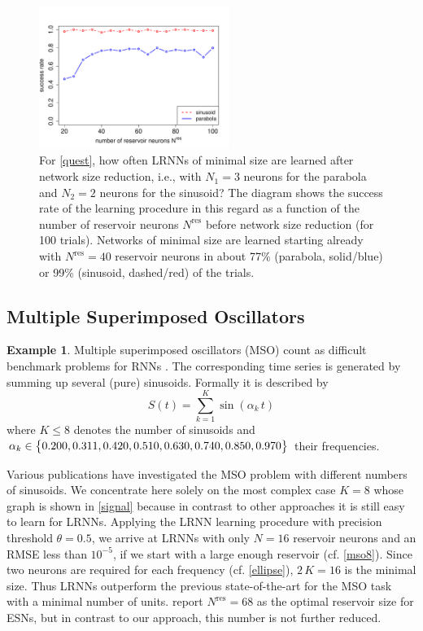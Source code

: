 \documentclass[twoside,11pt]{article}
\theoremstyle{definition}
\newtheorem{exmp}{Example}
\begin{document}
\begin{figure}
	\centering
	\includegraphics[width=0.55\textwidth]{fig/accuracy}
	\caption{For \cref{quest}, how often LRNNs of minimal size are
	learned after network size reduction, i.e., with $N_1 = 3$ neurons for
	the parabola and $N_2 = 2$ neurons for the sinusoid? The diagram shows
	the success rate of the learning procedure in this regard as a function
	of the number of reservoir neurons $N^\mathrm{res}$ before network size
	reduction (for 100 trials). Networks of minimal size are learned
	starting already with $N^\mathrm{res} = 40$ reservoir neurons in about
	77\% (parabola, solid/blue) or 99\% (sinusoid, dashed/red) of the
	trials.}
        \label{dimens}
\end{figure}

\subsection{Multiple Superimposed Oscillators}\label{mso}

\begin{exmp}\label{exmp}
Multiple superimposed oscillators (MSO) count as difficult benchmark problems
for RNNs \citep{KLB12,SW+07}. The corresponding time
series is generated by summing up several (pure) sinusoids. Formally
it is described by
	\[ S(t) = \sum\limits_{k=1}^K \sin(\alpha_k\,t) \]
where $K \le 8$ denotes the number of sinusoids and $\alpha_k \in \big\{ 0.200,
0.311, 0.420, 0.510, 0.630,\linebreak 0.740, 0.850, 0.970 \big\}$ their frequencies.
\end{exmp}

Various publications have investigated the MSO problem with different numbers of
sinusoids. We concentrate here solely on the most complex case $K=8$ whose graph
is shown in \cref{signal} because in contrast to other approaches it is still
easy to learn for LRNNs.
Applying the LRNN learning procedure with precision threshold $\theta = 0.5$,
we arrive at LRNNs with only $N=16$ reservoir neurons and an RMSE less than
$10^{-5}$, if we start with a large enough reservoir (cf. \cref{mso8}). Since
two neurons are required for each frequency (cf. \cref{ellipse}), $2\,K=16$ is
the minimal size. Thus LRNNs outperform the previous state-of-the-art for the
MSO task with a minimal number of units. \citet{KLB12} report $N^\mathrm{res} =
68$ as the optimal reservoir size for ESNs, but in contrast to our approach,
this number is not further reduced.
\end{document}
